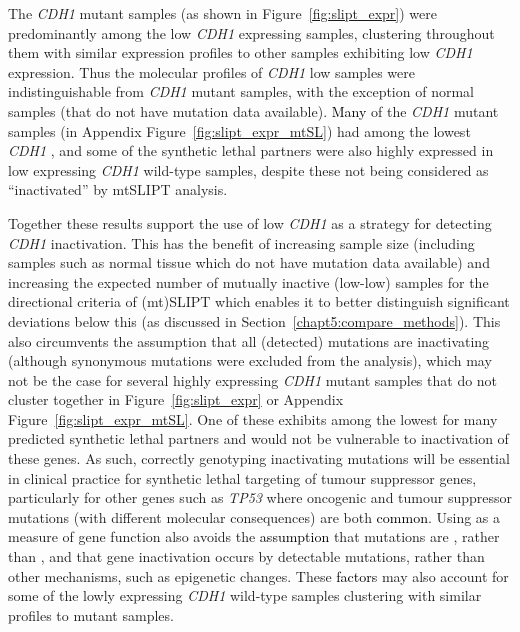 
The \textit{CDH1} \gls{mutant} samples (as shown in Figure~\ref{fig:slipt_expr}) were predominantly among the low \textit{CDH1} expressing samples, clustering throughout them with similar expression profiles to other samples exhibiting low \textit{CDH1} expression. Thus the molecular profiles of \textit{CDH1} low samples were indistinguishable from \textit{CDH1} \gls{mutant} samples, with the exception of normal samples (that do not have  \gls{mutation} data available). \textcolor{black}{Many} of the \textit{CDH1} \gls{mutant} samples (in Appendix Figure~\ref{fig:slipt_expr_mtSL}) had among the lowest \textit{CDH1} , and some of the \gls{synthetic lethal} partners were also highly expressed in low expressing \textit{CDH1} \gls{wild-type} samples, despite these not being considered as ``inactivated'' by \acrshort{mtSLIPT} analysis.

Together these results support the use of low \textit{CDH1}  as a strategy for detecting \textit{CDH1} inactivation. This has the benefit of increasing sample size (including samples such as normal tissue which do not have  \gls{mutation} data available) and increasing the expected number of mutually inactive (low-low) samples for the directional criteria of (mt)\gls{SLIPT} which enables it to better distinguish significant deviations below this (as discussed in Section~\ref{chapt5:compare_methods}). This also circumvents the assumption that all (detected) \glspl{mutation} are inactivating (although synonymous \glspl{mutation} were excluded from the analysis), which may not be the case for several highly expressing \textit{CDH1} \gls{mutant} samples that do not cluster together in Figure~\ref{fig:slipt_expr} or Appendix Figure~\ref{fig:slipt_expr_mtSL}. One of these exhibits among the lowest  for many predicted \gls{synthetic lethal} partners and would not be vulnerable to inactivation of these genes. As such, correctly genotyping inactivating \glspl{mutation} will be \gls{essential} in clinical practice for \gls{synthetic lethal} targeting of \gls{tumour suppressor} genes, particularly for other genes such as \textit{TP53} where oncogenic and \gls{tumour suppressor} \glspl{mutation} (with different molecular consequences) are both \textcolor{black}{common}. Using  as a measure of gene function also avoids the \textcolor{black}{assumption} that \glspl{mutation} are , rather than , and that gene inactivation occurs by detectable \glspl{mutation}, rather than other mechanisms\textcolor{black}{,} such as epigenetic changes. These \textcolor{black}{factors} may also account for some of the lowly expressing \textit{CDH1} \gls{wild-type} samples clustering with similar profiles to \gls{mutant} samples.


